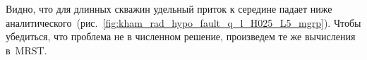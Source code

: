 \documentclass{article}
\begin{document}
% 		
% 		


Видно, что для длинных скважин удельный приток к середине падает ниже
аналитического~(рис.~\ref{fig:kham_rad_hypo_fault_q_l_H025_L5_mgrp}).
Чтобы убедиться, что проблема не в численном решение, произведем те же вычисления в~MRST.
\end{document}
